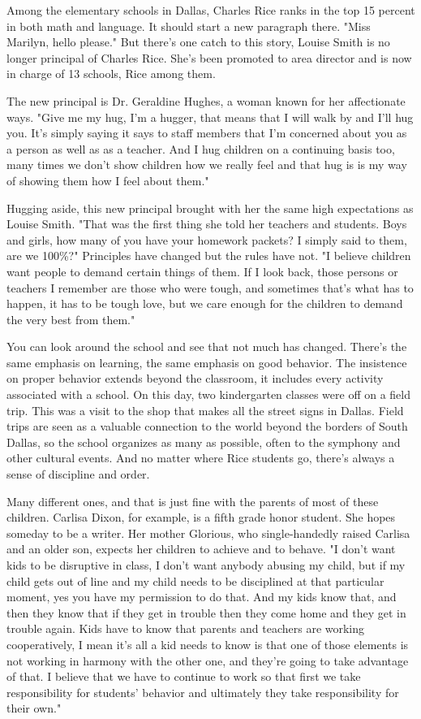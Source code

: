 Among the elementary schools in Dallas, Charles Rice ranks in the top 15 percent in both math and language. It should start a new paragraph there. "Miss Marilyn, hello please." But there's one catch to this story, Louise Smith is no longer principal of Charles Rice. She's been promoted to area director and is now in charge of 13 schools, Rice among them.

The new principal is Dr. Geraldine Hughes, a woman known for her affectionate ways. "Give me my hug, I'm a hugger, that means that I will walk by and I'll hug you. It's simply saying it says to staff members that I'm concerned about you as a person as well as as a teacher. And I hug children on a continuing basis too, many times we don't show children how we really feel and that hug is is my way of showing them how I feel about them."

Hugging aside, this new principal brought with her the same high expectations as Louise Smith. "That was the first thing she told her teachers and students. Boys and girls, how many of you have your homework packets? I simply said to them, are we 100\%?" Principles have changed but the rules have not. "I believe children want people to demand certain things of them. If I look back, those persons or teachers I remember are those who were tough, and sometimes that's what has to happen, it has to be tough love, but we care enough for the children to demand the very best from them."

You can look around the school and see that not much has changed. There's the same emphasis on learning, the same emphasis on good behavior. The insistence on proper behavior extends beyond the classroom, it includes every activity associated with a school. On this day, two kindergarten classes were off on a field trip. This was a visit to the shop that makes all the street signs in Dallas. Field trips are seen as a valuable connection to the world beyond the borders of South Dallas, so the school organizes as many as possible, often to the symphony and other cultural events. And no matter where Rice students go, there's always a sense of discipline and order.

Many different ones, and that is just fine with the parents of most of these children. Carlisa Dixon, for example, is a fifth grade honor student. She hopes someday to be a writer. Her mother Glorious, who single-handedly raised Carlisa and an older son, expects her children to achieve and to behave. "I don't want kids to be disruptive in class, I don't want anybody abusing my child, but if my child gets out of line and my child needs to be disciplined at that particular moment, yes you have my permission to do that. And my kids know that, and then they know that if they get in trouble then they come home and they get in trouble again. Kids have to know that parents and teachers are working cooperatively, I mean it's all a kid needs to know is that one of those elements is not working in harmony with the other one, and they're going to take advantage of that. I believe that we have to continue to work so that first we take responsibility for students' behavior and ultimately they take responsibility for their own."

